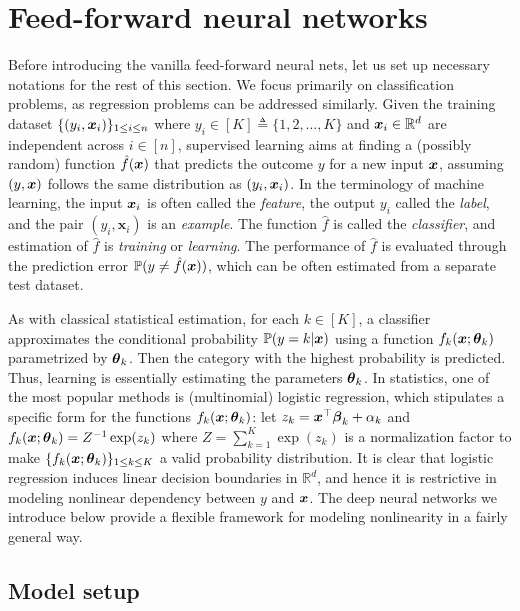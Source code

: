 \section{Feed-forward neural networks}\label{sec:super}

Before introducing the vanilla feed-forward neural nets, let us set up necessary notations for the rest of this section. We focus primarily on classification problems, as regression problems can be addressed similarly. Given the training dataset $\{ (y_i, \text{\boldmath $x$}_i )\}_{1\leq i\leq n}$ where $y_i \in [K] \triangleq \{1,2,\ldots,K\}$ and $\text{\boldmath $x$}_{i} \in \mathbb{R}^d$ are independent across $i \in [n]$, supervised learning aims at finding a (possibly random) function $\hat f(\text{\boldmath $x$})$ that predicts the outcome $y$ for a new input $\text{\boldmath $x$}$, assuming $(y, \text{\boldmath $x$})$ follows the same distribution as $(y_i, \text{\boldmath $x$}_i )$. In the terminology of machine learning, the input $\text{\boldmath $x$}_i$ is often called the \textit{feature}, the output $y_i$ called the \textit{label}, and the pair $(y_i,\bm{x}_i)$ is an \textit{example}. The function $\hat f$ is called the \textit{classifier}, and estimation of $\hat f$ is \textit{training} or \textit{learning}. The performance of $\hat f$ is evaluated through the prediction error $\mathbb{P}(y \neq \hat f(\text{\boldmath $x$}))$, which can be often estimated from a separate test dataset.

As with classical statistical estimation, for each $k \in [K]$, a classifier approximates the conditional probability $\mathbb{P}(y = k | \text{\boldmath $x$})$ using a function $f_k(\text{\boldmath $x$}; \text{\boldmath $\theta$}_k)$ parametrized by $\text{\boldmath $\theta$}_k$. Then the category with the highest probability is predicted. Thus, learning is essentially estimating the parameters $\text{\boldmath $\theta$}_k$. In statistics, one of the most popular methods is (multinomial) logistic regression, which stipulates a specific form for the functions $f_k(\text{\boldmath $x$}; \text{\boldmath $\theta$}_k)$: let $z_k = \text{\boldmath $x$}^\top \text{\boldmath $\beta$}_k + \alpha_k$ and $f_k(\text{\boldmath $x$}; \text{\boldmath $\theta$}_k) = Z^{-1} \exp(z_k)$ where $Z = \sum_{k=1}^K \exp(z_k)$ is a normalization factor to make $\{f_k(\text{\boldmath $x$}; \text{\boldmath $\theta$}_k)\}_{1\leq k \leq K}$ a valid probability distribution. It is clear that logistic regression induces linear decision boundaries in $\mathbb{R}^{d}$, and hence it is restrictive in modeling nonlinear dependency between $y$ and $\text{\boldmath $x$}$. The deep neural networks we introduce below provide a flexible framework for modeling nonlinearity in a fairly general way.

\subsection{Model setup}


